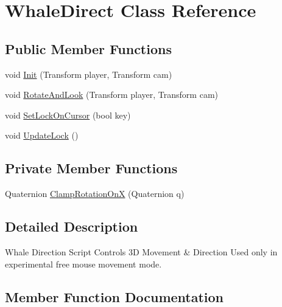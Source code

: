 \hypertarget{class_whale_direct}{}\section{Whale\+Direct Class Reference}
\label{class_whale_direct}
\subsection*{Public Member Functions}
\begin{DoxyCompactItemize}
\item 
void \hyperlink{class_whale_direct_a782d4d5e42b0f197080b4bc703cd83a9}{Init} (Transform player, Transform cam)
\item 
void \hyperlink{class_whale_direct_a726224202ede10e4d812468509537e3f}{Rotate\+And\+Look} (Transform player, Transform cam)
\item 
void \hyperlink{class_whale_direct_a1c761dcd8ea22f316ade723a2fc0e09a}{Set\+Lock\+On\+Cursor} (bool key)
\item 
void \hyperlink{class_whale_direct_a1eca2c459f459cd5b4bc6963c15aa5fb}{Update\+Lock} ()
\end{DoxyCompactItemize}
\subsection*{Private Member Functions}
\begin{DoxyCompactItemize}
\item 
Quaternion \hyperlink{class_whale_direct_aa1ba12dfe3841069efb4cb94b9b3bdfd}{Clamp\+Rotation\+OnX} (Quaternion q)
\end{DoxyCompactItemize}


\subsection{Detailed Description}
Whale Direction Script Controls 3D Movement \& Direction Used only in experimental free mouse movement mode. 



\subsection{Member Function Documentation}
\mbox{\label{class_whale_direct_aa1ba12dfe3841069efb4cb94b9b3bdfd}} 
